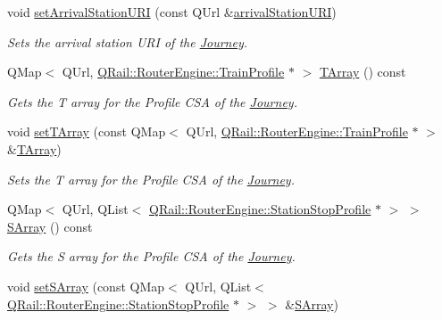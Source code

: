\begin{DoxyCompactItemize}
void \mbox{\hyperlink{classQRail_1_1RouterEngine_1_1Journey_a9de983071525978f05440677003566df}{set\+Arrival\+Station\+U\+RI}} (const Q\+Url \&\mbox{\hyperlink{classQRail_1_1RouterEngine_1_1Journey_a94616e16630e6047dd4770e723ec4bfa}{arrival\+Station\+U\+RI}})
\begin{DoxyCompactList}\small\item\em Sets the arrival station U\+RI of the \mbox{\hyperlink{classQRail_1_1RouterEngine_1_1Journey}{Journey}}. \end{DoxyCompactList}\item 
Q\+Map$<$ Q\+Url, \mbox{\hyperlink{classQRail_1_1RouterEngine_1_1TrainProfile}{Q\+Rail\+::\+Router\+Engine\+::\+Train\+Profile}} $\ast$ $>$ \mbox{\hyperlink{classQRail_1_1RouterEngine_1_1Journey_ab35795d36beaf773a9946c2b217ecca1}{T\+Array}} () const
\begin{DoxyCompactList}\small\item\em Gets the T array for the Profile C\+SA of the \mbox{\hyperlink{classQRail_1_1RouterEngine_1_1Journey}{Journey}}. \end{DoxyCompactList}\item 
void \mbox{\hyperlink{classQRail_1_1RouterEngine_1_1Journey_acbdb23fc240d5344a20a753bcbb332d5}{set\+T\+Array}} (const Q\+Map$<$ Q\+Url, \mbox{\hyperlink{classQRail_1_1RouterEngine_1_1TrainProfile}{Q\+Rail\+::\+Router\+Engine\+::\+Train\+Profile}} $\ast$ $>$ \&\mbox{\hyperlink{classQRail_1_1RouterEngine_1_1Journey_ab35795d36beaf773a9946c2b217ecca1}{T\+Array}})
\begin{DoxyCompactList}\small\item\em Sets the T array for the Profile C\+SA of the \mbox{\hyperlink{classQRail_1_1RouterEngine_1_1Journey}{Journey}}. \end{DoxyCompactList}\item 
Q\+Map$<$ Q\+Url, Q\+List$<$ \mbox{\hyperlink{classQRail_1_1RouterEngine_1_1StationStopProfile}{Q\+Rail\+::\+Router\+Engine\+::\+Station\+Stop\+Profile}} $\ast$ $>$ $>$ \mbox{\hyperlink{classQRail_1_1RouterEngine_1_1Journey_a737847fba5cb96e84825dc5b28f4e8f2}{S\+Array}} () const
\begin{DoxyCompactList}\small\item\em Gets the S array for the Profile C\+SA of the \mbox{\hyperlink{classQRail_1_1RouterEngine_1_1Journey}{Journey}}. \end{DoxyCompactList}\item 
void \mbox{\hyperlink{classQRail_1_1RouterEngine_1_1Journey_a2f7b14171b6f2fbfcb3f5b5225e8f630}{set\+S\+Array}} (const Q\+Map$<$ Q\+Url, Q\+List$<$ \mbox{\hyperlink{classQRail_1_1RouterEngine_1_1StationStopProfile}{Q\+Rail\+::\+Router\+Engine\+::\+Station\+Stop\+Profile}} $\ast$ $>$ $>$ \&\mbox{\hyperlink{classQRail_1_1RouterEngine_1_1Journey_a737847fba5cb96e84825dc5b28f4e8f2}{S\+Array}})

\end{DoxyCompactItemize}
